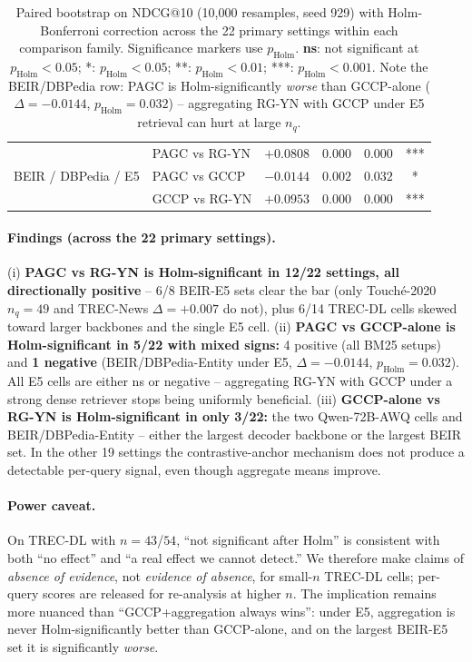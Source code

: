 \documentclass[sigconf]{acmart}
\begin{document}
\begin{table}[t]
\begin{tabular}{llcccc}
\midrule
\multirow{3}{*}{BEIR / DBPedia / E5}
 & PAGC vs RG-YN & $+0.0808$ & $0.000$ & $0.000$ & *** \\
 & PAGC vs GCCP  & $-0.0144$ & $0.002$ & $0.032$ & * \\
 & GCCP vs RG-YN & $+0.0953$ & $0.000$ & $0.000$ & *** \\
\bottomrule
\end{tabular}
\caption{Paired bootstrap on NDCG@10 (10{,}000 resamples, seed 929)
with Holm-Bonferroni correction across the 22 primary settings within
each comparison family. Significance markers use $p_{\text{Holm}}$.
\textbf{ns}: not significant at $p_{\text{Holm}}<0.05$;
*: $p_{\text{Holm}}<0.05$;
**: $p_{\text{Holm}}<0.01$;
***: $p_{\text{Holm}}<0.001$. Note the BEIR/DBPedia row: PAGC is
Holm-significantly \emph{worse} than GCCP-alone
($\Delta{=}{-}0.0144$, $p_{\text{Holm}}{=}0.032$) -- aggregating
RG-YN with GCCP under E5 retrieval can hurt at large $n_q$.}
\label{tab:stats}
\end{table}

\paragraph{Findings (across the 22 primary settings).}
(i) \textbf{PAGC vs RG-YN is Holm-significant in 12/22 settings,
all directionally positive} -- 6/8 BEIR-E5 sets clear the bar
(only Touch\'e-2020 $n_q{=}49$ and TREC-News $\Delta{=}{+}0.007$
do not), plus 6/14 TREC-DL cells skewed toward larger backbones
and the single E5 cell.
(ii) \textbf{PAGC vs GCCP-alone is Holm-significant in 5/22 with
mixed signs:} 4 positive (all BM25 setups) and \textbf{1 negative}
(BEIR/DBPedia-Entity under E5, $\Delta{=}{-}0.0144$,
$p_{\text{Holm}}{=}0.032$). All E5 cells are either ns or
negative -- aggregating RG-YN with GCCP under a strong dense
retriever stops being uniformly beneficial.
(iii) \textbf{GCCP-alone vs RG-YN is Holm-significant in only
3/22:} the two Qwen-72B-AWQ cells and BEIR/DBPedia-Entity --
either the largest decoder backbone or the largest BEIR set. In
the other 19 settings the contrastive-anchor mechanism does not
produce a detectable per-query signal, even though aggregate
means improve.

\paragraph{Power caveat.} On TREC-DL with $n{=}43$/$54$, ``not
significant after Holm'' is consistent with both ``no effect'' and
``a real effect we cannot detect.'' We therefore make claims of
\emph{absence of evidence}, not \emph{evidence of absence}, for
small-$n$ TREC-DL cells; per-query scores are released for
re-analysis at higher $n$. The implication remains more nuanced
than ``GCCP+aggregation always wins'': under E5, aggregation is
never Holm-significantly better than GCCP-alone, and on the largest
BEIR-E5 set it is significantly \emph{worse}.
\end{document}
